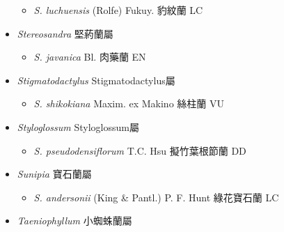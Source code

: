 \begin{itemize}
  \begin{itemize}
        \item[] \textit{S. luchuensis} (Rolfe) Fukuy.  豹紋蘭   LC
  \end{itemize}
 \item[] \textit{Stereosandra} 堅葯蘭屬
                                
  \begin{itemize}
        \item[] \textit{S. javanica} Bl.  肉藥蘭   EN
  \end{itemize}
 \item[] \textit{Stigmatodactylus} Stigmatodactylus屬
                                
  \begin{itemize}
        \item[] \textit{S. shikokiana} Maxim. ex Makino  絲柱蘭   VU
  \end{itemize}
 \item[] \textit{Styloglossum} Styloglossum屬
                                
  \begin{itemize}
        \item[] \textit{S. pseudodensiflorum} T.C. Hsu  擬竹葉根節蘭   DD
  \end{itemize}
 \item[] \textit{Sunipia} 寶石蘭屬
                                
  \begin{itemize}
        \item[] \textit{S. andersonii} (King \& Pantl.) P. F. Hunt  綠花寶石蘭   LC
  \end{itemize}
 \item[] \textit{Taeniophyllum} 小蜘蛛蘭屬
                                

\end{itemize}
